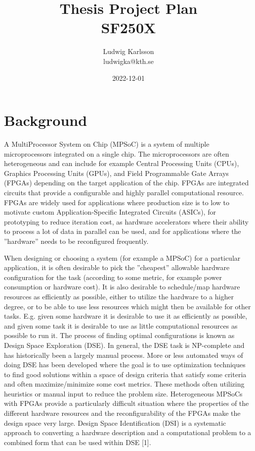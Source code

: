 \documentclass[12pt,titlepage]{article}
\title{Thesis Project Plan\\SF250X}
\author{Ludwig Karlsson\\ludwigka@kth.se}
\date{2022-12-01}
\begin{document}
\maketitle

\section{Background}
A MultiProcessor System on Chip (MPSoC) is a system of multiple microprocessors integrated on a single chip. The microprocessors are often heterogeneous and can include for example Central Processing Units (CPUs), Graphics Processing Units (GPUs), and Field Programmable Gate Arrays (FPGAs) depending on the target application of the chip. FPGAs are integrated circuits that provide a configurable and highly parallel computational resource. FPGAs are widely used for applications where production size is to low to motivate custom Application-Specific Integrated Circuits (ASICs), for prototyping to reduce iteration cost, as hardware accelerators where their ability to process a lot of data in parallel can be used, and for applications where the ''hardware'' needs to be reconfigured frequently.

When designing or choosing a system (for example a MPSoC) for a particular application, it is often desirable to pick the ''cheapest'' allowable hardware configuration for the task (according to some metric, for example power consumption or hardware cost). It is also desirable to schedule/map hardware resources as efficiently as possible, either to utilize the hardware to a higher degree, or to be able to use less resources which might then be available for other tasks. E.g. given some hardware it is desirable to use it as efficiently as possible, and given some task it is desirable to use as little computational resources as possible to run it. The process of finding optimal configurations is known as Design Space Exploration (DSE). In general, the DSE task is NP-complete and has historically been a largely manual process. More or less automated ways of doing DSE has been developed where the goal is to use optimization techniques to find good solutions within a space of design criteria that satisfy some criteria and often maximize/minimize some cost metrics. These methods often utilizing heuristics or manual input to reduce the problem size. Heterogeneous MPSoCs with FPGAs provide a particularly difficult situation where the properties of the different hardware resources and the reconfigurability of the FPGAs make the design space very large. Design Space Identification (DSI) is a systematic approach to converting a hardware description and a computational problem to a combined form that can be used within DSE [1].
\end{document}
